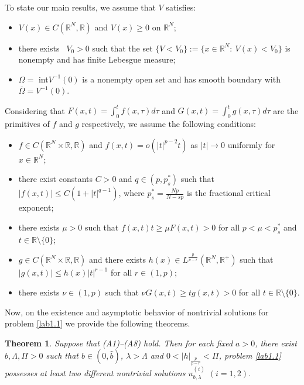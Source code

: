 \documentclass[10pt,a4paper]{amsart}
\numberwithin{equation}{section}
\newtheorem{theorem}{Theorem}[section]
\begin{document}
To state our main results, we assume that $V$ satisfies:
\begin{itemize}
\item[(A1)] $V(x)\in C(\mathbb{R}^N, \mathbb{R})$ and $V(x)\geq0$ on $\mathbb{R}^N$;

\item[(A2)] there exists ~$V_0>0$ such that the set
$\{V<V_0\}:=\{x\in\mathbb{R}^N: ~V(x)<V_0\}$ is nonempty and has finite Lebesgue measure;

\item[(A3)] $\Omega=$ int$V^{-1}(0)$ is a nonempty open set and has smooth boundary
 with $\overline{\Omega}=V^{-1}(0)$.
\end{itemize}
Considering that $F(x,t)=\int_0^tf(x,\tau)d\tau $ and $G(x,t)=\int_0^tg(x,\tau)d\tau$ 
are the primitives of $f$ and $g$ respectively, we assume the following conditions:
\begin{itemize}
\item[(A4)] $f\in C(\mathbb R^N\times\mathbb R, \mathbb R)$ and $f(x,t)=o(|t|^{p-2}t)$
as $|t|\to  0$ uniformly for $x\in \mathbb R^N$;

\item[(A5)] there exist constants $C>0$ and $q\in(p, p^*_s)$ such that
$|f(x,t)|\leq C(1+|t|^{q-1})$, where $p^*_s=\frac{Np}{N-sp}$ is the fractional 
critical exponent;

\item[(A6)] there exists $\mu>0$ such that $f(x,t)t\geq\mu F(x,t)>0$ for all 
$p<\mu<p^*_s$ and $t\in \mathbb R\setminus\{0\}$;

\item[(A7)] $g\in C(\mathbb R^N\times\mathbb R, \mathbb R)$ and there exists
$h(x)\in L^{\frac{p}{p-r}}(\mathbb R^N, \mathbb R^+)$ such that 
$|g(x,t)|\leq h(x)|t|^{r-1}$ for all $r\in(1,p)$;

\item[(A8)] there exists $\nu\in(1,p)$ such that $\nu G(x,t)\geq tg(x,t)>0$ for all
$t\in \mathbb R \setminus\{0\}$.
\end{itemize}

Now, on the existence and asymptotic behavior of nontrivial solutions for
problem \eqref{lab1.1} we provide the following theorems.


\begin{theorem} \label{thm1.1}
Suppose that {(A1)--(A8)} hold. Then for each fixed $a>0$, there exist
$\widehat{b}, \Lambda, \Pi>0$ such that $b\in(0,\widehat{b})$, $\lambda>\Lambda$ and 
$0<|h|_\frac{p}{p-r}<\Pi$, problem \eqref{lab1.1} possesses at least two different 
nontrivial solutions $u_{b,\lambda}^{(i)}$ $(i=1,2)$.
\end{theorem}
\end{document}
